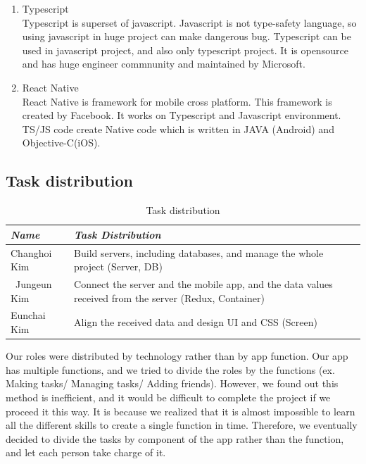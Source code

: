 \documentclass[conference]{IEEEtran}
\begin{document}
\begin{enumerate}
    \item Typescript \\
    Typescript is superset of javascript. Javascript is not type-safety language, so using javascript in huge project can make dangerous bug. Typescript can be used in javascript project, and also only typescript project. It is opensource and has huge engineer commnunity and maintained by Microsoft. \\
    
    \item React Native \\
    React Native is framework for mobile cross platform. This framework is created by Facebook. It works on Typescript and Javascript environment. TS/JS code create Native code which is written in JAVA (Android) and Objective-C(iOS).
    
\end{enumerate}

\subsection{Task distribution}

\begin{table}[h!]
\caption{Task distribution}
\begin{center}
\begin{tabular}{ | m{2cm} | m{6cm} | }
\hline
\textbf{\textit{Name}}& \textbf{\textit{Task Distribution}} \\
\hline
Changhoi Kim& Build servers, including databases, and manage the whole project (Server, DB) \\
\hline\
Jungeun Kim & Connect the server and the mobile app, and the data values received from the server (Redux, Container) \\
\hline
Eunchai Kim & Align the received data and design UI and CSS (Screen) \\
\hline
\end{tabular}
\label{tab1}
\end{center}
\end{table}

Our roles were distributed by technology rather than by app function. Our app has multiple functions, and we tried to divide the roles by the functions (ex. Making tasks/ Managing tasks/ Adding friends). However, we found out this method is inefficient, and it would be difficult to complete the project if we proceed it this way. It is because we realized that it is almost impossible to learn all the different skills to create a single function in time. Therefore, we eventually decided to divide the tasks by component of the app rather than the function, and let each person take charge of it. \\
\end{document}
